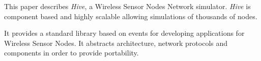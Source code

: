 This paper describes \textit{Hive}, a Wireless Sensor Nodes Network simulator.
\textit{Hive} is component based and highly scalable allowing simulations
of thousands of nodes.

It provides a standard library based on events for developing applications
for Wireless Sensor Nodes. It abstracts architecture, network protocols and
components in order to provide portability.

